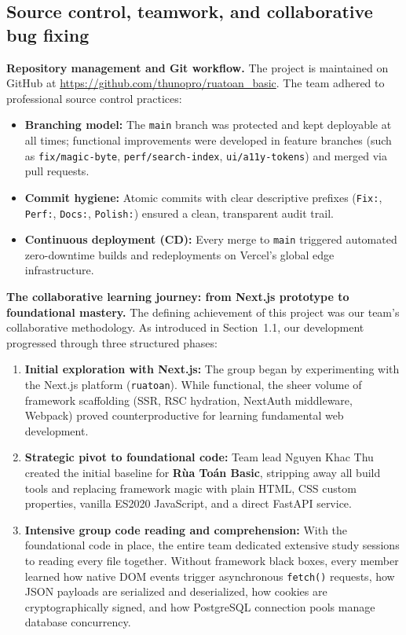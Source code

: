 \subsection{Source control, teamwork, and collaborative bug fixing}\label{sec:teamwork}\label{sec:cleanup}
\textbf{Repository management and Git workflow.}
The project is maintained on GitHub at \url{https://github.com/thunopro/ruatoan_basic}.
The team adhered to professional source control practices:
\begin{itemize}
  \item \textbf{Branching model:} The \texttt{main} branch was protected and kept deployable at all times;
        functional improvements were developed in feature branches (such as \texttt{fix/magic-byte},
        \texttt{perf/search-index}, \texttt{ui/a11y-tokens}) and merged via pull requests.
  \item \textbf{Commit hygiene:} Atomic commits with clear descriptive prefixes (\texttt{Fix:}, \texttt{Perf:},
        \texttt{Docs:}, \texttt{Polish:}) ensured a clean, transparent audit trail.
  \item \textbf{Continuous deployment (CD):} Every merge to \texttt{main} triggered automated zero-downtime
        builds and redeployments on Vercel's global edge infrastructure.
\end{itemize}

\textbf{The collaborative learning journey: from Next.js prototype to foundational mastery.}
The defining achievement of this project was our team's collaborative methodology. As introduced in
Section~1.1, our development progressed through three structured phases:
\begin{enumerate}
  \item \textbf{Initial exploration with Next.js:} The group began by experimenting with the Next.js platform
        (\texttt{ruatoan}). While functional, the sheer volume of framework scaffolding (SSR, RSC hydration,
        NextAuth middleware, Webpack) proved counterproductive for learning fundamental web development.
  \item \textbf{Strategic pivot to foundational code:} Team lead Nguyen Khac Thu created the initial baseline
        for \textbf{Rùa Toán Basic}, stripping away all build tools and replacing framework magic with plain HTML,
        CSS custom properties, vanilla ES2020 JavaScript, and a direct FastAPI service.
  \item \textbf{Intensive group code reading and comprehension:} With the foundational code in place, the entire
        team dedicated extensive study sessions to reading every file together. Without framework black boxes,
        every member learned how native DOM events trigger asynchronous \texttt{fetch()} requests, how JSON payloads
        are serialized and deserialized, how cookies are cryptographically signed, and how PostgreSQL connection
        pools manage database concurrency.
\end{enumerate}

